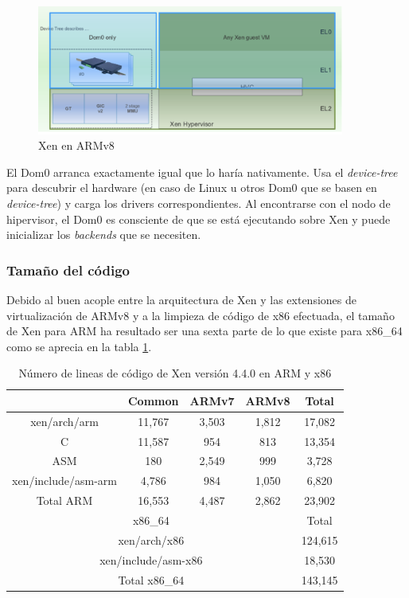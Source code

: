 \begin{figure}[!h]
  \centering
  \includegraphics[width=0.90\textwidth]{recursos/xen_3.png}
  \caption{Xen en ARMv8}
  \label{fig:xen_3}
\end{figure}

El Dom0 arranca exactamente igual que lo haría nativamente. Usa el \textit{device-tree} para descubrir el hardware (en caso de Linux u otros Dom0 que se basen en \textit{device-tree}) y carga los drivers correspondientes. Al encontrarse con el nodo de hipervisor, el Dom0 es consciente de que se está ejecutando sobre Xen y puede inicializar los \textit{backends} que se necesiten.

\subsubsection{Tamaño del código}

Debido al buen acople entre la arquitectura de Xen y las extensiones de virtualización de ARMv8 y a la limpieza de código de x86 efectuada, el tamaño de Xen para ARM ha resultado ser una sexta parte de lo que existe para x86\_64 como se aprecia en la tabla \ref{table:results45}.

\begin{table}[!ht]
  \centering
	\begin{tabular}{ |c|c|c|c|c| }
		\hline
     & Common & ARMv7 & ARMv8 & Total\\
    \hline
    xen/arch/arm          & 11,767      & 3,503  & 1,812   & 17,082 \\
    \hline
    C                     & 11,587      & 954    & 813	    & 13,354 \\
    \hline
    ASM                   & 180         & 2,549  & 999     & 3,728  \\
    \hline
    xen/include/asm-arm   & 4,786       & 984    & 1,050   & 6,820  \\
    \hline
    Total ARM	            & 16,553  & 4,487  & 2,862        & 23,902 \\
    \hline
    \multicolumn{4}{|c|}{x86\_64}                           & Total\\
    \hline
    \multicolumn{4}{|c|}{xen/arch/x86}                      & 124,615\\
    \hline
    \multicolumn{4}{|c|}{xen/include/asm-x86}               & 18,530 \\
    \hline
    \multicolumn{4}{|c|}{Total x86\_64}                     & 143,145\\
    \hline
	\end{tabular}
	\caption{Número de lineas de código de Xen versión 4.4.0 en ARM y x86 \cite{xen_arm_whitepaper}}
  \label{table:results45}
\end{table}

